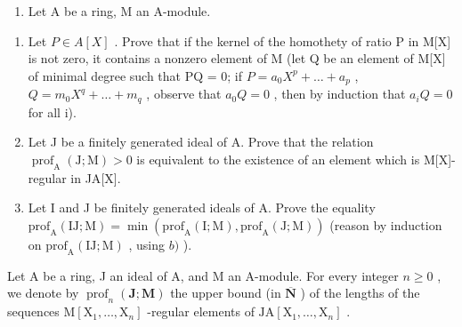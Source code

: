 \begin{enumerate}
\def\labelenumi{\arabic{enumi})}
\setcounter{enumi}{11}
\tightlist
\item
  Let A be a ring, M an A-module.
\end{enumerate}

\begin{enumerate}
\def\labelenumi{\alph{enumi})}
\item
  Let \(P \in A[X]\) . Prove that if the kernel of the homothety of ratio P in M{[}X{]} is not zero, it contains a nonzero element of M (let Q be an element of M{[}X{]} of minimal degree such that PQ = 0; if \(P = a_{0}X^{p} + \ldots + a_{p}\) , \(Q = m_{0}X^{q} + \ldots + m_{q}\) , observe that \(a_{0}Q = 0\) , then by induction that \(a_{i}Q = 0\) for all i).
\item
  Let J be a finitely generated ideal of A. Prove that the relation \(\operatorname{prof}_{\mathrm{A}}(\mathrm{J};\mathrm{M}) > 0\) is equivalent to the existence of an element which is M{[}X{]}-regular in JA{[}X{]}.
\item
  Let I and J be finitely generated ideals of A. Prove the equality \(\mathrm{prof}_{\mathrm{A}}(\mathrm{IJ};\mathrm{M}) = \min (\mathrm{prof}_{\mathrm{A}}(\mathrm{I};\mathrm{M}),\mathrm{prof}_{\mathrm{A}}(\mathrm{J};\mathrm{M}))\) (reason by induction on \(\mathrm{prof}_{\mathrm{A}}(\mathrm{IJ};\mathrm{M})\) , using \(b)\) ).
\end{enumerate}

Let A be a ring, J an ideal of A, and M an A-module. For every integer \(n \geqslant 0\) , we denote by \(\operatorname{prof}_{n}(\mathbf{J}; \mathbf{M})\) the upper bound (in \(\overline{\mathbf{N}}\) ) of the lengths of the sequences \(\mathrm{M}[\mathrm{X}_{1}, \ldots, \mathrm{X}_{n}]\) -regular elements of \(\mathrm{JA}[\mathrm{X}_{1}, \ldots, \mathrm{X}_{n}]\) .


